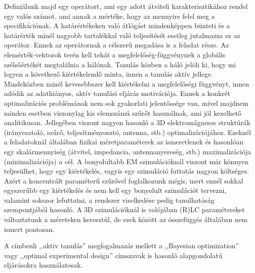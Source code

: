 \documentclass[12pt,a4paper,oneside]{report}
\begin{document}
Definiálunk majd egy operátort, ami egy adott átviteli karakterisztikához rendel egy valós számot, ami annak a mértéke, hogy az mennyire felel meg a specifikációnak. A határértékeken való átlógást mindenképpen bünteti és a határérték minél nagyobb tartalékkal való teljesítését esetleg jutalmazza ez az operátor. Ennek az operátornak a célszerű megadása is a feladat része. Az elemérték-vektorok terén kell tehát a megfelelőség-függvénynek a globális szélsőértékét megtalálnia a hálónak. Tanulás közben a háló jelöli ki, hogy mi legyen a következő kiértékelendő minta, innen a tanulás aktív jellege. Mindeközben minél kevesebbszer kell kiértékelni a megfelelőségi függvényt, innen adódik az adathiányos, aktív tanulási eljárás motivációja. Ennek a konkrét optimalizációs problémának nem sok gyakorlati jelentőssége van, mivel majdnem minden esetben viszonylag kis elemszámú szűrőt használnak, ami jól kezelhető analitikusan. Jellegében viszont nagyon hasonló a 3D elektromágneses struktúrák (iránycsatoló, szűrő, teljesítményosztó, antenna, stb.) optimalizációjához. Ezeknél a feladatoknál általában fizikai méretparaméterek az ismeretlenek és hasonlóan egy skalármennyiség (átvitel, impedancia, antennanyereség, stb.) maximalizációja (minimalizációja) a cél. A bonyolultabb EM szimulációknál viszont már könnyen teljesülhet, hogy egy kiértékelés, vagyis egy szimuláció futtatás nagyon költséges. Azért a koncentrált paraméterű szűrővel foglalkozunk mégis, mert ennél sokkal egyszerűbb egy kiértékelés és nem kell egy bonyolult szimulációt tervezni, valamint sokszor lefuttatni, a rendszer viselkedése pedig tanulhatóság szempontjából hasonló. A 3D szimulációknál is valójában (R)LC paramétereket változtatunk a méreteken keresztül, de ezek között az összefüggés általában nem ismert pontosan.

A címbenli ,,aktív tanulás'' megfogalmazás mellett a ,,Bayesian optimization'' vagy ,,optimal experimental design'' címszavak is hasonló alapgondolatú eljárásokra használatosak.
\end{document}
